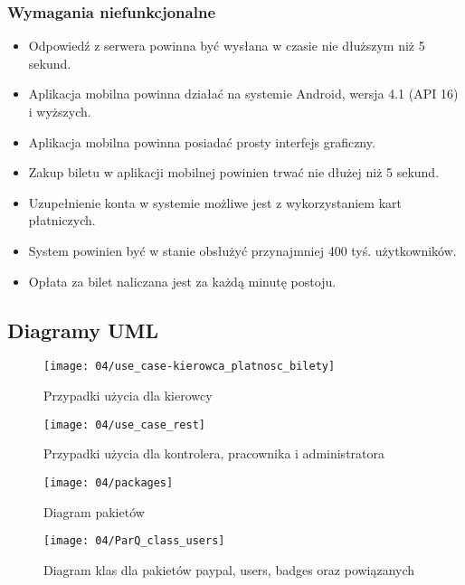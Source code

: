 \subsubsection*{Wymagania niefunkcjonalne}

\begin{itemize}
	\item Odpowiedź z serwera powinna być wysłana w czasie nie dłuższym niż 5 sekund.
	\item Aplikacja mobilna powinna działać na systemie Android, wersja 4.1 (API 16) i wyższych.
	\item Aplikacja mobilna powinna posiadać prosty interfejs graficzny.
	\item Zakup biletu w aplikacji mobilnej powinien trwać nie dłużej niż 5 sekund.
	\item Uzupełnienie konta w systemie możliwe jest z wykorzystaniem kart płatniczych.
	\item System powinien być w stanie obsłużyć przynajmniej 400 tyś. użytkowników.
	\item Opłata za bilet naliczana jest za każdą minutę postoju.
\end{itemize}

\newpage
\subsection{Diagramy UML}

\begin{figure}[h]
	\begin{center}
		\texttt{[image: 04/use\_case-kierowca\_platnosc\_bilety]}
	\end{center}
	\caption{Przypadki użycia dla kierowcy}
\end{figure}

\begin{figure}[p]
	\begin{center}
		\texttt{[image: 04/use\_case\_rest]}
	\end{center}
	\caption{Przypadki użycia dla kontrolera, pracownika i administratora}
\end{figure}

\begin{figure}[p]
	\begin{center}
		\texttt{[image: 04/packages]}
	\end{center}
	\caption{Diagram pakietów}
\end{figure}

\begin{figure}[p]
	\begin{center}
		\texttt{[image: 04/ParQ\_class\_users]}
	\end{center}
	\caption{Diagram klas dla pakietów paypal, users, badges oraz powiązanych}
\end{figure}

